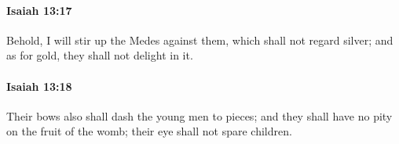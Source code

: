 		\paragraph{Isaiah 13:17} %
			\label{ISAIAH-13-17}

			Behold, I will stir up the Medes against them, which shall not regard silver; and as for gold, they shall not delight in it.


		\paragraph{Isaiah 13:18} %
			\label{ISAIAH-13-18}

			Their bows also shall dash the young men to pieces; and they shall have no pity on the fruit of the womb; their eye shall not spare children.


